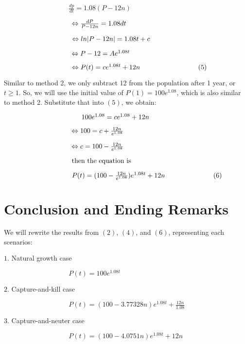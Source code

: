 \documentclass{article}
\begin{document}
$\hspace{4cm} \frac{dp}{dt} = 1.08(P-12n)$

$\hspace{3.5cm} \Leftrightarrow \frac{dP}{P-12n} = 1.08dt $

$\hspace{3.5cm} \Leftrightarrow ln|P-12n| = 1.08t + c$

$\hspace{3.5cm} \Leftrightarrow P-12 = Ae^{1.08t}$

$\hspace{3.5cm} \Leftrightarrow P(t) = ce^{1.08t} +12n \hspace{3cm}(5)$

Similar to method 2, we only subtract 12 from the population after 1 year, or $t \geq 1$. So, we will use the initial value of $P(1) = 100e^{1.08}$, which is also similar to method 2. Substitute that into $(5)$, we obtain:

$\hspace{4.0cm} 100e^{1.08} = ce^{1.08} + 12n$

$\hspace{3.5cm} \Leftrightarrow 100 = c + \frac{12n}{e^{1.08}}$

$\hspace{3.5cm} \Leftrightarrow c = 100 - \frac{12n}{e^{1.08}}$

$\hspace{3.5cm} \text{then the equation is} $

$\hspace{3.5cm}P(t) = (100 - \frac{12n}{e^{1.08}})e^{1.08t} +12n \hspace{2.5cm}(6)$


\section{Conclusion and Ending Remarks}

We will rewrite the results from $(2)$, $(4)$, and $(6)$, representing each scenarios: 

$1.$ Natural growth case

$\hspace{4cm}  P(t) = 100e^{1.08t}$

$2.$ Capture-and-kill case

$\hspace{4cm}  P(t) = (100-3.77328n)e^{1.08t} + \frac{12n}{1.08}$

$3.$ Capture-and-neuter case

$\hspace{4cm}  P(t) = (100 - 4.0751n)e^{1.08t} +12n $
\end{document}
